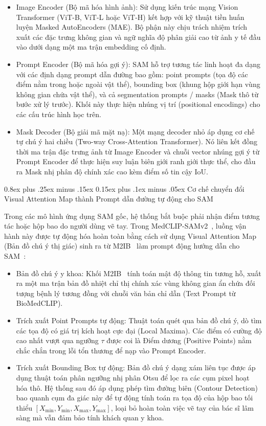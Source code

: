 \documentclass[conference]{IEEEtran}
\makeatletter
\def\subsection{\@startsection{subsection}{2}{\z@}%
  {0.8ex plus .25ex minus .15ex}%
  {0.15ex plus .1ex minus .05ex}%
  {\reset@font\normalsize\itshape}}%
\makeatother
\begin{document}
\begin{itemize}
    \item Image Encoder (Bộ mã hóa hình ảnh): Sử dụng kiến trúc mạng Vision Transformer (ViT-B, ViT-L hoặc ViT-H) kết hợp với kỹ thuật tiền huấn luyện Masked AutoEncoders (MAE). Bộ phận này chịu trách nhiệm trích xuất các đặc trưng không gian và ngữ nghĩa độ phân giải cao từ ảnh y tế đầu vào dưới dạng một ma trận embedding cố định.
    \item Prompt Encoder (Bộ mã hóa gợi ý): SAM hỗ trợ tương tác linh hoạt đa dạng với các định dạng prompt dẫn đường bao gồm: point prompts (tọa độ các điểm nằm trong hoặc ngoài vật thể), bounding box (khung hộp giới hạn vùng không gian chứa vật thể), và cả segmentation prompts / masks (Mask thô từ bước xử lý trước). Khối này thực hiện nhúng vị trí (positional encodings) cho các cấu trúc hình học trên.
    \item Mask Decoder (Bộ giải mã mặt nạ): Một mạng decoder nhỏ áp dụng cơ chế tự chú ý hai chiều (Two-way Cross-Attention Transformer). Nó liên kết đồng thời ma trận đặc trưng ảnh từ Image Encoder và chuỗi vector nhúng gợi ý từ Prompt Encoder để thực hiện suy luận biên giới ranh giới thực thể, cho đầu ra Mask nhị phân độ chính xác cao kèm điểm số tin cậy IoU.
\end{itemize}

\subsection{Cơ chế chuyển đổi Visual Attention Map thành Prompt dẫn đường tự động cho SAM}

Trong các mô hình ứng dụng SAM gốc, hệ thống bắt buộc phải nhận điểm tương tác hoặc hộp bao do người dùng vẽ tay. Trong MedCLIP-SAMv2~\cite{ref1}, luồng vận hành này được tự động hóa hoàn toàn bằng cách sử dụng Visual Attention Map (Bản đồ chú ý thị giác) sinh ra từ M2IB~\cite{ref7} làm prompt động hướng dẫn cho SAM~\cite{ref2,ref4}:

\begin{itemize}
    \item Bản đồ chú ý y khoa: Khối M2IB~\cite{ref7} tính toán mật độ thông tin tương hỗ, xuất ra một ma trận bản đồ nhiệt chỉ thị chính xác vùng không gian ẩn chứa đối tượng bệnh lý tương đồng với chuỗi văn bản chỉ dẫn (Text Prompt từ BioMedCLIP).
    \item Trích xuất Point Prompts tự động: Thuật toán quét qua bản đồ chú ý, dò tìm các tọa độ có giá trị kích hoạt cực đại (Local Maxima). Các điểm có cường độ cao nhất vượt qua ngưỡng $\tau$ được coi là Điểm dương (Positive Points) nằm chắc chắn trong lỗi tổn thương để nạp vào Prompt Encoder.
    \item Trích xuất Bounding Box tự động: Bản đồ chú ý dạng xám liên tục được áp dụng thuật toán phân ngưỡng nhị phân Otsu để lọc ra các cụm pixel hoạt hóa thô. Hệ thống sau đó áp dụng phép tìm đường biên (Contour Detection) bao quanh cụm đa giác này để tự động tính toán ra tọa độ của hộp bao tối thiểu $[X_{\min}, Y_{\min}, X_{\max}, Y_{\max}]$, loại bỏ hoàn toàn việc vẽ tay của bác sĩ lâm sàng mà vẫn đảm bảo tính khách quan y khoa.
\end{itemize}
\end{document}
